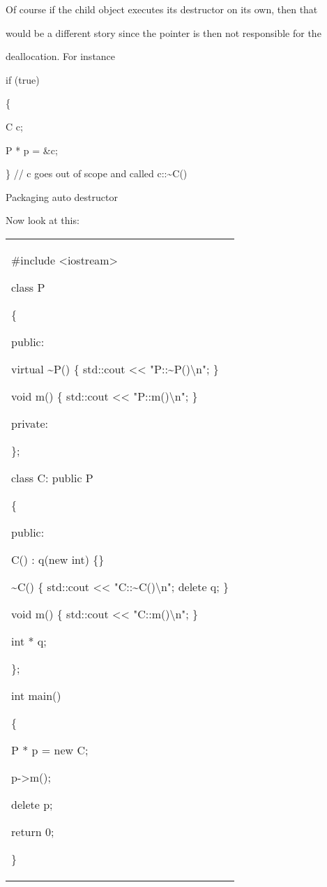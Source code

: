 \documentclass[
]{article}
\begin{document}
Of course if the child object executes its destructor on its own, then
that

would be a different story since the pointer is then not responsible for
the

deallocation. For instance

if (true)

\{

C c;

P * p = \&c;

\} // c goes out of scope and called c::\textasciitilde C()

Packaging auto destructor

Now look at this:

\begin{longtable}[]{@{}
  >{\raggedright\arraybackslash}p{}@{}}
\toprule\noalign{}
 \\
\midrule\noalign{}
\endhead
\bottomrule\noalign{}
\endlastfoot
\#include \textless iostream\textgreater{}

class P

\{

public:

\textbf{ }virtual \textasciitilde P() \{ std::cout \textless\textless{}
"P::\textasciitilde P()\textbackslash n"; \}

void m() \{ std::cout \textless\textless{} "P::m()\textbackslash n"; \}

private:

\};

class C: public P

\{

public:

C() : q(new int) \{\}

\textasciitilde C() \{ std::cout \textless\textless{}
"C::\textasciitilde C()\textbackslash n"; delete q; \}

void m() \{ std::cout \textless\textless{} "C::m()\textbackslash n"; \}

int * q;

\};

int main()

\{

P * p = new C;

p-\textgreater m();

delete p;

return 0;

\} \\
\end{longtable}
\end{document}
